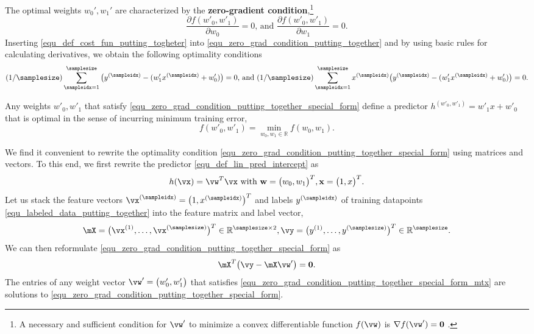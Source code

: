 \documentclass[12pt]{report}
\begin{document}
The optimal weights $w_{0}',w_{1}'$ are characterized by the 
{\bf zero-gradient condition},\footnote{A necessary and sufficient 
condition for $\vw'$ to minimize a convex differentiable function 
$f(\vw)$ is $\nabla f(\vw') = \mathbf{0}$ \cite[Sec.\ 4.2.3]{BoydConvexBook}.} 
\begin{equation}
\label{equ_zero_grad_condition_putting_together}
\frac{\partial f(w'_{0},w'_{1})}{\partial w_{0}} = 0 \mbox{, and }\frac{\partial f(w'_{0},w'_{1})}{\partial w_{1}} = 0. 
\end{equation} 
Inserting \eqref{equ_def_cost_fun_putting_togheter} into \eqref{equ_zero_grad_condition_putting_together} and 
by using basic rules for calculating derivatives, we obtain the 
following optimality conditions 
\begin{equation}
\label{equ_zero_grad_condition_putting_together_special_form}
 (1/\samplesize) \sum_{\sampleidx=1}^{\samplesize} \big( y^{(\sampleidx)} - ( w'_{1} x^{(\sampleidx)} + w'_{0}) \big)= 0 \mbox{, and } (1/\samplesize) \sum_{\sampleidx=1}^{\samplesize} x^{(\sampleidx)} \big( y^{(\sampleidx)} - ( w'_{1} x^{(\sampleidx)} + w'_{0}) \big) = 0. 
\end{equation} 

Any weights $w'_{0},w'_{1}$ that satisfy \eqref{equ_zero_grad_condition_putting_together_special_form} 
define a predictor $h^{(w'_{0},w'_{1})} = w'_{1}x + w'_{0}$ that 
is optimal in the sense of incurring minimum training error, 
$$f(w'_{0},w'_{1}) = \min_{w_{0},w_{1} \in \mathbb{R}} f(w_{0},w_{1}).$$

We find it convenient to rewrite the optimality condition \eqref{equ_zero_grad_condition_putting_together_special_form} 
using matrices and vectors. To this end, we first rewrite the 
predictor \eqref{equ_def_lin_pred_intercept} as 
$$ h(\vx) = \vw^{T} \vx \mbox{ with } \mathbf{w} = \big(w_{0},w_{1}\big)^{T}, \mathbf{x} = \big(1,x\big)^{T}.$$
Let us stack the feature vectors $\vx^{(\sampleidx)} = \big(1,x^{(\sampleidx)} \big)^{T}$ 
and labels $y^{(\sampleidx)}$ of training datapoints \eqref{equ_labeled_data_putting_together} 
into the feature matrix and label vector, 
\begin{equation}
\mX  = \big(\vx^{(1)},\ldots,\vx^{(\samplesize)}\big)^{T} \in \mathbb{R}^{\samplesize \times 2}, \vy = \big(y^{(1)},\ldots,y^{(\samplesize)}\big)^{T} \in \mathbb{R}^{\samplesize}. 
\end{equation} 
We can then reformulate \eqref{equ_zero_grad_condition_putting_together_special_form} as 
\begin{equation}
\label{equ_zero_grad_condition_putting_together_special_form_mtx}
\mX^{T} \big( \vy - \mX \vw' \big) = \mathbf{0}. 
\end{equation} 
The entries of any weight vector $\vw' = \big(w_{0}',w_{1}'\big)$ that satisfies 
\eqref{equ_zero_grad_condition_putting_together_special_form_mtx} are solutions to 
\eqref{equ_zero_grad_condition_putting_together_special_form}. 
\end{document}
